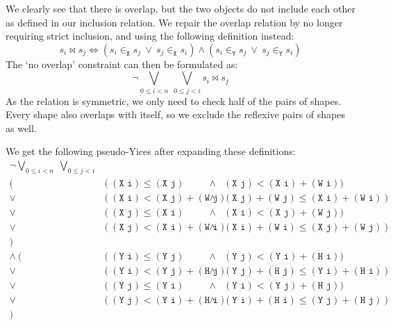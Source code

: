 \documentclass[12pt]{article}
\begin{document}
We clearly see that there is overlap, but the two objects do not include each other as defined in our inclusion relation.
We repair the overlap relation by no longer requiring strict inclusion, and using the following definition instead:
\[ s_i \bowtie s_j \iff (s_i \in_{\texttt{X}} s_j ~\vee~ s_j \in_{\texttt{X}} s_i) \wedge (s_i \in_{\texttt{Y}} s_j ~\vee~ s_j \in_{\texttt{Y}} s_i) \]
The `no overlap' constraint can then be formulated as:
\[ \neg \bigvee_{0 \le i < n} ~ \bigvee_{0 \le j < i} s_i \bowtie s_j \]
As the relation is symmetric, we only need to check half of the pairs of shapes.
Every shape also overlaps with itself, so we exclude the reflexive pairs of shapes as well.

We get the following pseudo-Yices after expanding these definitions:
\[
    \begin{array}{rlcl}
        \neg \bigvee_{0 \le i < n} ~ \bigvee_{0 \le j < i} & & & \\
            (~~~ & (~(\texttt{X i}) \le (\texttt{X j}) & \wedge & (\texttt{X j}) < (\texttt{X i}) + (\texttt{W i}) ) \\
            \vee & (~(\texttt{X i}) < (\texttt{X j}) + (\texttt{W j}) & \wedge & (\texttt{X j}) + (\texttt{W j}) \le (\texttt{X i}) + (\texttt{W i})~) \\
            \vee & (~(\texttt{X j}) \le (\texttt{X i}) & \wedge & (\texttt{X i}) < (\texttt{X j}) + (\texttt{W j}) ) \\
            \vee & (~(\texttt{X j}) < (\texttt{X i}) + (\texttt{W i}) & \wedge & (\texttt{X i}) + (\texttt{W i}) \le (\texttt{X j}) + (\texttt{W j})~) \\
            )~~~ & & & \\
     \wedge~(~~~ & (~(\texttt{Y i}) \le (\texttt{Y j}) & \wedge & (\texttt{Y j}) < (\texttt{Y i}) + (\texttt{H i}) ) \\
            \vee & (~(\texttt{Y i}) < (\texttt{Y j}) + (\texttt{H j}) & \wedge & (\texttt{Y j}) + (\texttt{H j}) \le (\texttt{Y i}) + (\texttt{H i})~) \\
            \vee & (~(\texttt{Y j}) \le (\texttt{Y i}) & \wedge & (\texttt{Y i}) < (\texttt{Y j}) + (\texttt{H j}) ) \\
            \vee & (~(\texttt{Y j}) < (\texttt{Y i}) + (\texttt{H i}) & \wedge & (\texttt{Y i}) + (\texttt{H i}) \le (\texttt{Y j}) + (\texttt{H j})~) \\
            )~~~ & & & \\
    \end{array}
\]
\end{document}
